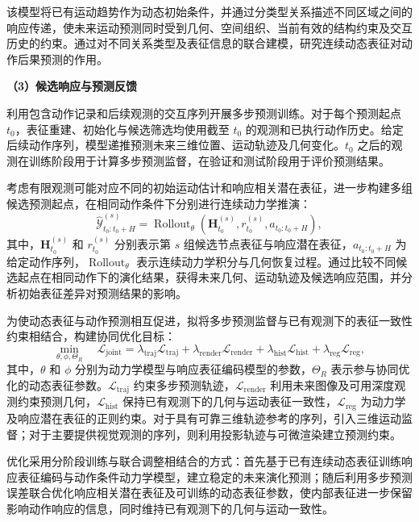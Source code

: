 该模型将已有运动趋势作为动态初始条件，并通过分类型关系描述不同区域之间的响应传递，使未来运动预测同时受到几何、空间组织、当前有效的结构约束及交互历史的约束。通过对不同关系类型及表征信息的联合建模，研究连续动态表征对动作后果预测的作用。

\noindent\textbf{（3）候选响应与预测反馈}

利用包含动作记录和后续观测的交互序列开展多步预测训练。对于每个预测起点 $t_0$，表征重建、初始化与候选筛选均使用截至 $t_0$ 的观测和已执行动作历史。给定后续动作序列，模型递推预测未来三维位置、运动轨迹及几何变化。$t_0$ 之后的观测在训练阶段用于计算多步预测监督，在验证和测试阶段用于评价预测结果。

考虑有限观测可能对应不同的初始运动估计和响应相关潜在表征，进一步构建多组候选预测起点，在相同动作条件下分别进行连续动力学推演：
\begin{equation}
  \widehat{\mathcal{Y}}_{t_0:t_0+H}^{(s)}
  =
  \operatorname{Rollout}_{\theta}
  \left(
    \mathbf{H}_{t_0}^{(s)},
    r_{t_0}^{(s)},
    a_{t_0:t_0+H}
  \right),
  \label{eq:route-response-candidate-rollout}
\end{equation}
其中，$\mathbf{H}_{t_0}^{(s)}$ 和 $r_{t_0}^{(s)}$ 分别表示第 $s$ 组候选节点表征与响应潜在表征，$a_{t_0:t_0+H}$ 为给定动作序列，$\operatorname{Rollout}_{\theta}$ 表示连续动力学积分与几何恢复过程。通过比较不同候选起点在相同动作下的演化结果，获得未来几何、运动轨迹及候选响应范围，并分析初始表征差异对预测结果的影响。

为使动态表征与动作预测相互促进，拟将多步预测监督与已有观测下的表征一致性约束相结合，构建协同优化目标：
\begin{equation}
  \min_{\theta,\phi,\Theta_R}\quad
  \mathcal{L}_{\mathrm{joint}}
  = \lambda_{\mathrm{traj}}\mathcal{L}_{\mathrm{traj}}
  + \lambda_{\mathrm{render}}\mathcal{L}_{\mathrm{render}}
  + \lambda_{\mathrm{hist}}\mathcal{L}_{\mathrm{hist}}
  + \lambda_{\mathrm{reg}}\mathcal{L}_{\mathrm{reg}},
  \label{eq:route-response-joint-objective}
\end{equation}
其中，$\theta$ 和 $\phi$ 分别为动力学模型与响应表征编码模型的参数，$\Theta_R$ 表示参与协同优化的动态表征参数。$\mathcal{L}_{\mathrm{traj}}$ 约束多步预测轨迹，$\mathcal{L}_{\mathrm{render}}$ 利用未来图像及可用深度观测约束预测几何，$\mathcal{L}_{\mathrm{hist}}$ 保持已有观测下的几何与运动表征一致性，$\mathcal{L}_{\mathrm{reg}}$ 为动力学及响应潜在表征的正则约束。对于具有可靠三维轨迹参考的序列，引入三维运动监督；对于主要提供视觉观测的序列，则利用投影轨迹与可微渲染建立预测约束。

优化采用分阶段训练与联合调整相结合的方式：首先基于已有连续动态表征训练响应表征编码与动作条件动力学模型，建立稳定的未来演化预测；随后利用多步预测误差联合优化响应相关潜在表征及可训练的动态表征参数，使内部表征进一步保留影响动作响应的信息，同时维持已有观测下的几何与运动一致性。

